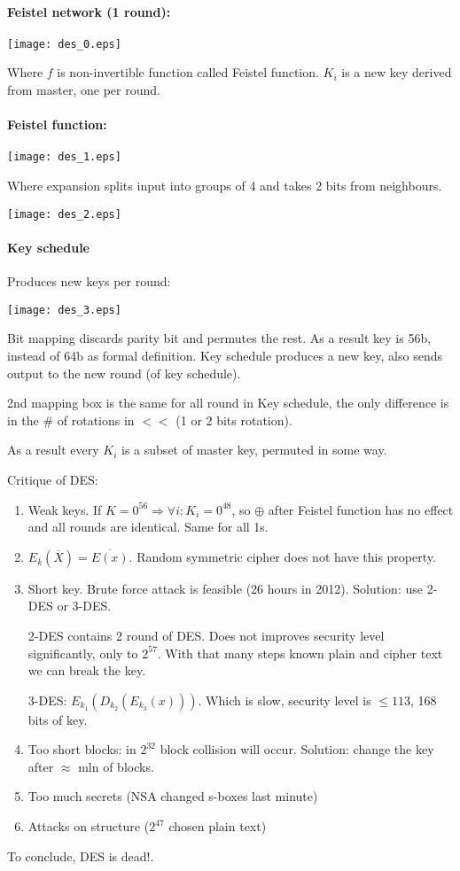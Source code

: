 \paragraph{Feistel network (1 round):}

	\texttt{[image: des\_0.eps]}

Where $f$ is non-invertible function called Feistel function. $K_i$ is a new key derived from master, one per round.

\paragraph{Feistel function:}

	\texttt{[image: des\_1.eps]}

Where expansion splits input into groups of 4 and takes 2 bits from neighbours.

	\texttt{[image: des\_2.eps]}

\paragraph{Key schedule} Produces new keys per round:

	\texttt{[image: des\_3.eps]}

Bit mapping discards parity bit and permutes the rest. As a result key is 56b, instead of 64b as formal definition.
Key schedule produces a new key, also sends output to the new round (of key schedule).

2nd mapping box is the same for all round in Key schedule, the only difference is in the \# of rotations in $<<$ (1 or 2 bits rotation).

As a result every $K_i$ is a subset of master key, permuted in some way.

Critique of DES:
\begin{enumerate}
	\item Weak keys. If $K = 0^{56} \Rightarrow \forall i: K_i = 0^{48}$, so $\oplus$ after Feistel function has no effect and all rounds are identical. Same for all 1s.
	\item $E_{\overline{k}}(\overline{X}) = \overline{E(x)}$. Random symmetric cipher does not have this property.
	\item Short key. Brute force attack is feasible (26 hours in 2012).
		Solution: use 2-DES or 3-DES.

		2-DES contains 2 round of DES. Does not improves security level significantly, only to $2^{57}$.
		With that many steps known plain and cipher text we can break the key.

		3-DES: $E_{k_1}(D_{k_2}(E_{k_3}(x)))$. Which is slow, security level is $\leq 113$, 168 bits of key.

	\item Too short blocks: in $2^{32}$ block collision will occur.
		Solution: change the key after $\approx$ mln of blocks.
	\item Too much secrets (NSA changed s-boxes last minute)
	\item Attacks on structure ($2^{47}$ chosen plain text)
\end{enumerate}
To conclude, DES is dead!.
